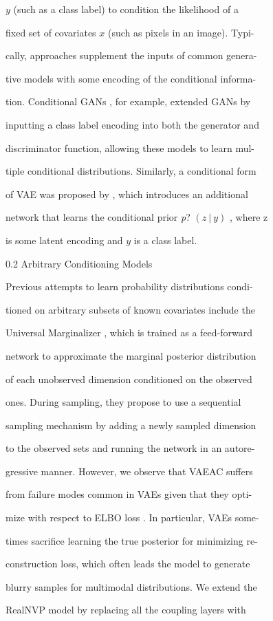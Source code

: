 \documentclass[a4paper,12pt]{article}
\begin{document}
$y$ (such as a class label) to condition the likelihood of a

fixed set of covariates $x$ (such as pixels in an image). Typi-

cally, approaches supplement the inputs of common genera-

tive models with some encoding of the conditional informa-

tion. Conditional GANs , for example, extended GANs by

inputting a class label encoding into both the generator and

discriminator function, allowing these models to learn mul-

tiple conditional distributions. Similarly, a conditional form

of VAE was proposed by , which introduces an additional

network that learns the conditional prior {\it p}? $(z\ |\ y)$ , where $\mathrm{z}$

is some latent encoding and $y$ is a class label.

0.2 Arbitrary Conditioning Models

Previous attempts to learn probability distributions condi-

tioned on arbitrary subsets of known covariates include the

Universal Marginalizer , which is trained as a feed-forward

network to approximate the marginal posterior distribution

of each unobserved dimension conditioned on the observed

ones. During sampling, they propose to use a sequential

sampling mechanism by adding a newly sampled dimension

to the observed sets and running the network in an autore-

gressive manner. However, we observe that VAEAC suffers

from failure modes common in VAEs given that they opti-

mize with respect to ELBO loss . In particular, VAEs some-

times sacrifice learning the true posterior for minimizing re-

construction loss, which often leads the model to generate

blurry samples for multimodal distributions. We extend the

RealNVP model by replacing all the coupling layers with
\end{document}
